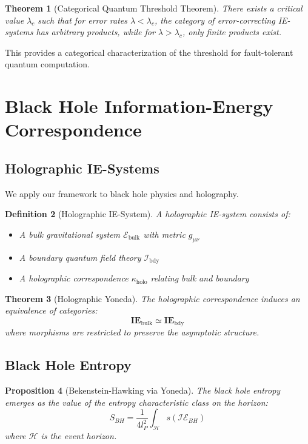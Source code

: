 \documentclass[12pt]{article}
\newtheorem{theorem}{Theorem}[section]
\newtheorem{proposition}[theorem]{Proposition}
\newtheorem{definition}[theorem]{Definition}
\begin{document}
\begin{theorem}[Categorical Quantum Threshold Theorem]
There exists a critical value $\lambda_c$ such that for error rates $\lambda < \lambda_c$, the category of error-correcting IE-systems has arbitrary products, while for $\lambda > \lambda_c$, only finite products exist.
\end{theorem}

This provides a categorical characterization of the threshold for fault-tolerant quantum computation.

\section{Black Hole Information-Energy Correspondence}

\subsection{Holographic IE-Systems}

We apply our framework to black hole physics and holography.

\begin{definition}[Holographic IE-System]
A holographic IE-system consists of:
\begin{itemize}
\item A bulk gravitational system $\mathcal{E}_{\text{bulk}}$ with metric $g_{\mu\nu}$
\item A boundary quantum field theory $\mathcal{I}_{\text{bdy}}$
\item A holographic correspondence $\kappa_{\text{holo}}$ relating bulk and boundary
\end{itemize}
\end{definition}

\begin{theorem}[Holographic Yoneda]
The holographic correspondence induces an equivalence of categories:
\[\mathbf{IE}_{\text{bulk}} \simeq \mathbf{IE}_{\text{bdy}}\]
where morphisms are restricted to preserve the asymptotic structure.
\end{theorem}

\subsection{Black Hole Entropy}

\begin{proposition}[Bekenstein-Hawking via Yoneda]
The black hole entropy emerges as the value of the entropy characteristic class on the horizon:
\[S_{BH} = \frac{1}{4l_P^2} \int_{\mathcal{H}} s(\mathcal{IE}_{BH})\]
where $\mathcal{H}$ is the event horizon.
\end{proposition}
\end{document}
